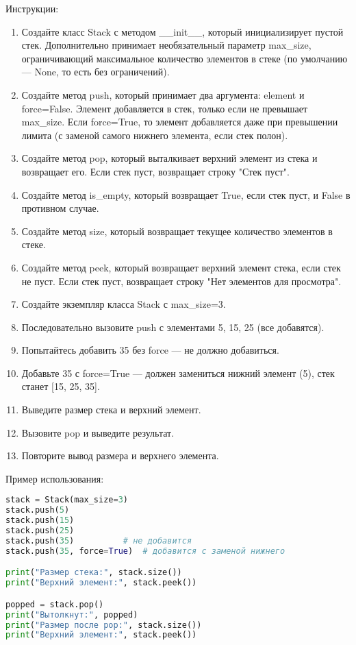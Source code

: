 \begin{enumerate}
Инструкции:
\begin{enumerate}
    \item Создайте класс Stack с методом \_\_init\_\_, который инициализирует пустой стек. Дополнительно принимает необязательный параметр max\_size, ограничивающий максимальное количество элементов в стеке (по умолчанию — None, то есть без ограничений).
    \item Создайте метод push, который принимает два аргумента: element и force=False. Элемент добавляется в стек, только если не превышает max\_size. Если force=True, то элемент добавляется даже при превышении лимита (с заменой самого нижнего элемента, если стек полон).
    \item Создайте метод pop, который выталкивает верхний элемент из стека и возвращает его. Если стек пуст, возвращает строку "Стек пуст".
    \item Создайте метод is\_empty, который возвращает True, если стек пуст, и False в противном случае.
    \item Создайте метод size, который возвращает текущее количество элементов в стеке.
    \item Создайте метод peek, который возвращает верхний элемент стека, если стек не пуст. Если стек пуст, возвращает строку "Нет элементов для просмотра".
    \item Создайте экземпляр класса Stack с max\_size=3.
    \item Последовательно вызовите push с элементами 5, 15, 25 (все добавятся).
    \item Попытайтесь добавить 35 без force — не должно добавиться.
    \item Добавьте 35 с force=True — должен замениться нижний элемент (5), стек станет [15, 25, 35].
    \item Выведите размер стека и верхний элемент.
    \item Вызовите pop и выведите результат.
    \item Повторите вывод размера и верхнего элемента.
\end{enumerate}

Пример использования:
\begin{lstlisting}[language=Python]
stack = Stack(max_size=3)
stack.push(5)
stack.push(15)
stack.push(25)
stack.push(35)          # не добавится
stack.push(35, force=True)  # добавится с заменой нижнего

print("Размер стека:", stack.size())
print("Верхний элемент:", stack.peek())

popped = stack.pop()
print("Вытолкнут:", popped)
print("Размер после pop:", stack.size())
print("Верхний элемент:", stack.peek())
\end{lstlisting}


\end{enumerate}
